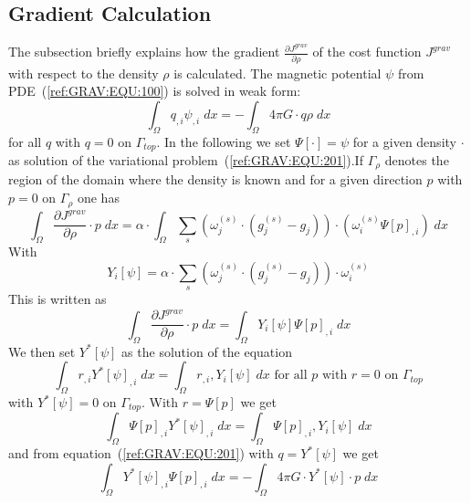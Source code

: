 \subsection{Gradient Calculation}
The subsection briefly explains how the gradient $\frac{\partial J^{grav}}{\partial \rho}$  of the cost function $J^{grav}$ with respect to the 
density $\rho$ is calculated. 
The magnetic potential $\psi$ from PDE~(\ref{ref:GRAV:EQU:100})  is solved in weak form:
\begin{equation}\label{ref:GRAV:EQU:201}
\int_{\Omega} q_{,i} \psi_{,i} \; dx  = - \int_{\Omega}  4\pi G \cdot q \rho\; dx 
\end{equation} 
for all $q$ with $q=0$ on $\Gamma_{top}$. In the following we set $\Psi[\cdot]=\psi$ for a given density $\cdot$ as solution
of the variational problem~(\ref{ref:GRAV:EQU:201}).If $\Gamma_{\rho}$ denotes the region of the domain where the density is known
and for a given direction $p$ with $p=0$ on $\Gamma_{\rho}$ one has
\begin{equation}\label{ref:GRAV:EQU:201}
\int_{\Omega}   \frac{\partial J^{grav}}{\partial \rho} \cdot p \; dx  = \alpha \cdot  \int_{\Omega}  
\sum_{s} (\omega^{(s)}_j \cdot 
(g^{(s)}_j-g_{j}) ) \cdot ( \omega^{(s)}_i \Psi[p]_{,i})  \; dx  
\end{equation} 
With 
\begin{equation}\label{ref:GRAV:EQU:202c}
Y_i[\psi]= \alpha \cdot \sum_{s} (\omega^{(s)}_j \cdot 
(g^{(s)}_j-g_{j}) ) \cdot  \omega^{(s)}_i
\end{equation} 
This is written as 
\begin{equation}\label{ref:GRAV:EQU:201}
\int_{\Omega}   \frac{\partial J^{grav}}{\partial \rho} \cdot p \;  dx  = \int_{\Omega}  
Y_i[\psi] \Psi[p]_{,i} \; dx  
\end{equation} 
We then set $Y^*[\psi]$ as the solution of the equation 
\begin{equation}\label{ref:GRAV:EQU:202d}
\int_{\Omega} r_{,i} Y^*[\psi]_{,i} \; dx  =  \int_{\Omega} r_{,i} ,Y_i[\psi]  \; dx  \mbox{ for all } p \mbox{ with } r=0 \mbox{ on } \Gamma_{top}
\end{equation} 
with $Y^*[\psi]=0$ on $\Gamma_{top}$. With $r=\Psi[p]$ we get
\begin{equation}\label{ref:GRAV:EQU:202d}
\int_{\Omega} \Psi[p]_{,i} Y^*[\psi]_{,i} \; dx  =  \int_{\Omega} \Psi[p]_{,i} ,Y_i[\psi]  \; dx
\end{equation} 
and from equation~(\ref{ref:GRAV:EQU:201}) with $q=Y^*[\psi]$ we get
\begin{equation}\label{ref:GRAV:EQU:20e}
\int_{\Omega} Y^*[\psi]_{,i}  \Psi[p]_{,i} \; dx  = - \int_{\Omega}  4\pi G \cdot Y^*[\psi] \cdot  p\;  dx  
\end{equation}
